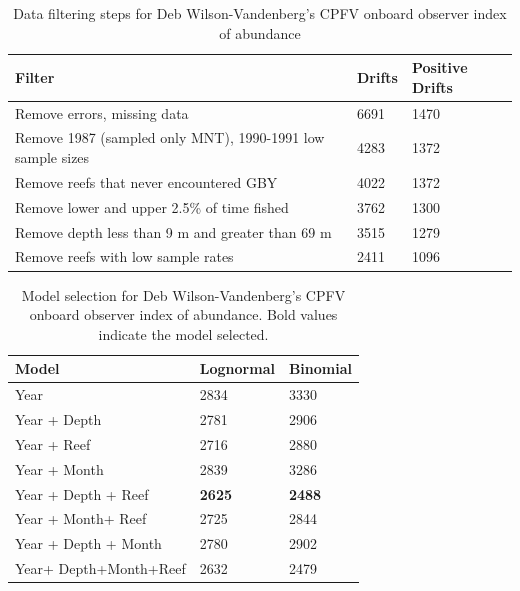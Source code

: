 \documentclass[12pt,]{article}
\begin{document}
\FloatBarrier

\begin{table}[ht]
\centering
\caption{Data filtering steps for Deb Wilson-Vandenberg's CPFV onboard observer 
                                        index of abundance} 
\label{tab:Fleet5_Filter}
\begin{tabular}{lll}
  \hline
Filter & Drifts & Positive Drifts \\ 
  \hline
Remove errors, missing data & 6691 & 1470 \\ 
  Remove 1987 (sampled only MNT), 1990-1991 low sample sizes & 4283 & 1372 \\ 
  Remove reefs that never encountered GBY & 4022 & 1372 \\ 
  Remove lower and upper 2.5\% of time fished & 3762 & 1300 \\ 
  Remove depth less than 9 m and greater than 69 m & 3515 & 1279 \\ 
  Remove reefs with low sample rates & 2411 & 1096 \\ 
   \hline
\end{tabular}
\end{table}\begin{table}[ht]
\centering
\caption{Model selection for Deb Wilson-Vandenberg's CPFV onboard observer 
                                        index of abundance. Bold values indicate the model selected.} 
\label{tab:Fleet5_AIC}
\begin{tabular}{lll}
  \hline
Model & Lognormal & Binomial \\ 
  \hline
Year & 2834 & 3330 \\ 
  Year + Depth & 2781 & 2906 \\ 
  Year + Reef & 2716 & 2880 \\ 
  Year + Month & 2839 & 3286 \\ 
  Year + Depth + Reef & \textbf{2625} & \textbf{2488} \\ 
  Year + Month+ Reef & 2725 & 2844 \\ 
  Year + Depth + Month & 2780 & 2902 \\ 
  Year+ Depth+Month+Reef & 2632 & 2479 \\ 
   \hline
\end{tabular}
\end{table}

\FloatBarrier
\end{document}
